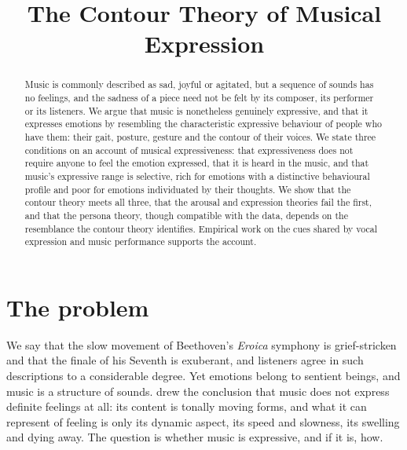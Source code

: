 \documentclass{situationist-preprint}
\title{The Contour Theory of Musical Expression}
\begin{document}
\maketitle

\begin{abstract}
Music is commonly described as sad, joyful or agitated, but a sequence of sounds has no feelings, and the sadness of a piece need not be felt by its composer, its performer or its listeners. We argue that music is nonetheless genuinely expressive, and that it expresses emotions by resembling the characteristic expressive behaviour of people who have them: their gait, posture, gesture and the contour of their voices. We state three conditions on an account of musical expressiveness: that expressiveness does not require anyone to feel the emotion expressed, that it is heard in the music, and that music's expressive range is selective, rich for emotions with a distinctive behavioural profile and poor for emotions individuated by their thoughts. We show that the contour theory meets all three, that the arousal and expression theories fail the first, and that the persona theory, though compatible with the data, depends on the resemblance the contour theory identifies. Empirical work on the cues shared by vocal expression and music performance supports the account.
\end{abstract}

\section{The problem}

We say that the slow movement of Beethoven's \emph{Eroica} symphony is grief-stricken and that the finale of his Seventh is exuberant, and listeners agree in such descriptions to a considerable degree. Yet emotions belong to sentient beings, and music is a structure of sounds. \citet{Hanslick1854} drew the conclusion that music does not express definite feelings at all: its content is tonally moving forms, and what it can represent of feeling is only its dynamic aspect, its speed and slowness, its swelling and dying away. The question is whether music is expressive, and if it is, how.
\end{document}
